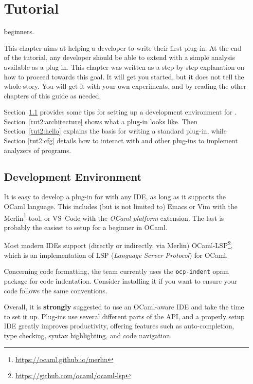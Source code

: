 
\chapter{Tutorial}\label{chap:tutorial}

\begin{target}beginners.\end{target}

This chapter aims at helping a developer to write their first \framac plug-in.
At the end of the tutorial, any developer should be able to extend \framac with
a simple analysis available as a \framac plug-in. This chapter was written as a
step-by-step explanation on how to proceed towards this goal. It will get you
started, but it does not tell the whole story. You will get it with your own
experiments, and by reading the other chapters of this guide as needed.

Section~\ref{tut2:environment} provides some tips for setting up a
development environment for \framac.
Section~\ref{tut2:architecture} shows what a plug-in looks like. Then
Section~\ref{tut2:hello} explains the basis for writing a standard \framac
plug-in, while Section \ref{tut2:cfg} details how to interact
with \framac and other plug-ins to implement analyzers of \C programs.

\section{Development Environment}\label{tut2:environment}

It is easy to develop a plug-in for \framac with any IDE, as long as it
supports the OCaml language. This includes (but is not limited to)
Emacs or Vim with the Merlin\footnote{\url{https://ocaml.github.io/merlin}}
tool, or VS~Code with the {\em OCaml platform} extension.
The last is probably the easiest to setup for a beginner in OCaml.

Most modern IDEs support (directly or indirectly, via Merlin)
OCaml-LSP\footnote{\url{https://github.com/ocaml/ocaml-lsp}},
which is an implementation of LSP ({\em Language Server Protocol}) for OCaml.

Concerning code formatting, the \framac team currently uses the
\texttt{ocp-indent} opam package for code indentation.
Consider installing it if you want to ensure your code follows the same
conventions.

Overall, it is \textbf{strongly} suggested to use an OCaml-aware IDE and take
the time to set it up. Plug-ins use several different parts of the \framac API,
and a properly setup IDE greatly improves productivity, offering features such
as auto-completion, type checking, syntax highlighting, and code navigation.

